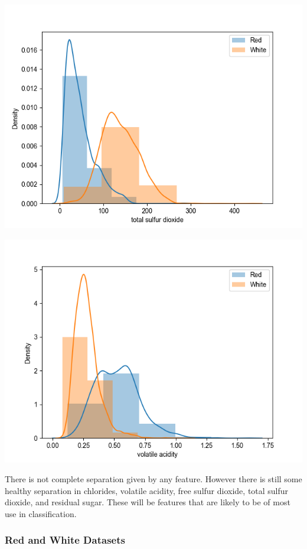 \documentclass[12pt, letterpaper]{article}
\begin{document}
\includegraphics[scale=\myscale]{class_dist_total_sulfur_dioxide.png}

\includegraphics[scale=\myscale]{class_dist_volatile_acidity.png}

There is not complete separation given by any feature. However there is still some healthy separation in chlorides, volatile acidity, free sulfur dioxide, total sulfur dioxide, and residual sugar. These will be features that are likely to be of most use in classification.

\subsubsection{Red and White Datasets}
\end{document}
